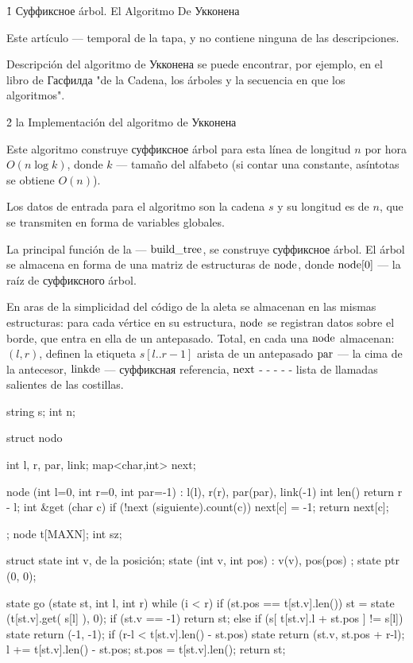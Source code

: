 \h1{ Суффиксное árbol. El Algoritmo De Укконена }

Este artículo --- temporal de la tapa, y no contiene ninguna de las descripciones.

Descripción del algoritmo de Укконена se puede encontrar, por ejemplo, en el libro de Гасфилда "de la Cadena, los árboles y la secuencia en que los algoritmos".


\h2{ la Implementación del algoritmo de Укконена }

Este algoritmo construye суффиксное árbol para esta línea de longitud $n$ por hora $O (n \log k)$, donde $k$ --- tamaño del alfabeto (si contar una constante, asíntotas se obtiene $O (n)$).

Los datos de entrada para el algoritmo son la cadena $s$ y su longitud es de $n$, que se transmiten en forma de variables globales.

La principal función de la --- $\rm build\_tree$, se construye суффиксное árbol. El árbol se almacena en forma de una matriz de estructuras de $\rm node$, donde ${\rm node}[0]$ --- la raíz de суффиксного árbol.

En aras de la simplicidad del código de la aleta se almacenan en las mismas estructuras: para cada vértice en su estructura, $\rm node$ se registran datos sobre el borde, que entra en ella de un antepasado. Total, en cada una $\rm node$ almacenan: $(l,r)$, definen la etiqueta $s[l..r-1]$ arista de un antepasado $\rm par$ --- la cima de la antecesor, $\rm link de$ --- суффиксная referencia, $\rm next$ - - - - - lista de llamadas salientes de las costillas.

\code
string s;
int n;

struct nodo {
int l, r, par, link;
map<char,int> next;

node (int l=0, int r=0, int par=-1)
: l(l), r(r), par(par), link(-1) {}
int len() { return r - l; }
int &get (char c) {
if (!next (siguiente).count(c)) next[c] = -1;
return next[c];
}
};
node t[MAXN];
int sz;

struct state {
int v, de la posición;
state (int v, int pos) : v(v), pos(pos) {}
};
state ptr (0, 0);

state go (state st, int l, int r) {
while (i < r)
if (st.pos == t[st.v].len()) {
st = state (t[st.v].get( s[l] ), 0);
if (st.v == -1) return st;
}
else {
if (s[ t[st.v].l + st.pos ] != s[l])
state return (-1, -1);
if (r-l < t[st.v].len() - st.pos)
state return (st.v, st.pos + r-l);
l += t[st.v].len() - st.pos;
st.pos = t[st.v].len();
}
return st;
}

